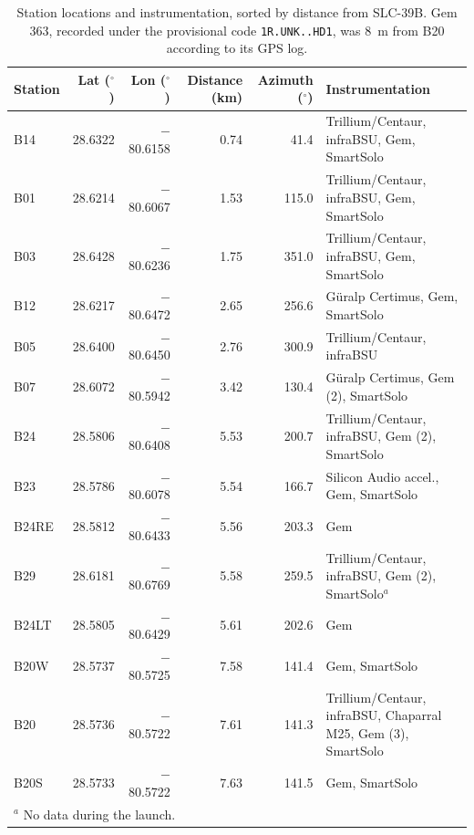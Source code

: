 \begin{table}[htbp]
  \centering
  \caption{Station locations and instrumentation, sorted by distance from SLC-39B. Gem 363, recorded under the provisional code \texttt{1R.UNK..HD1}, was 8~m from B20 according to its GPS log.}
  \label{tab:stations}
  \small
  \begin{tabular}{lrrrrp{5.2cm}}
  \toprule
  Station & Lat ($^{\circ}$) & Lon ($^{\circ}$) & Distance (km) & Azimuth ($^{\circ}$) & Instrumentation \\
  \midrule
  B14 & 28.6322 & $-$80.6158 & 0.74 & 41.4 & Trillium/Centaur, infraBSU, Gem, SmartSolo \\
  B01 & 28.6214 & $-$80.6067 & 1.53 & 115.0 & Trillium/Centaur, infraBSU, Gem, SmartSolo \\
  B03 & 28.6428 & $-$80.6236 & 1.75 & 351.0 & Trillium/Centaur, infraBSU, Gem, SmartSolo \\
  B12 & 28.6217 & $-$80.6472 & 2.65 & 256.6 & G\"{u}ralp Certimus, Gem, SmartSolo \\
  B05 & 28.6400 & $-$80.6450 & 2.76 & 300.9 & Trillium/Centaur, infraBSU \\
  B07 & 28.6072 & $-$80.5942 & 3.42 & 130.4 & G\"{u}ralp Certimus, Gem (2), SmartSolo \\
  B24 & 28.5806 & $-$80.6408 & 5.53 & 200.7 & Trillium/Centaur, infraBSU, Gem (2), SmartSolo \\
  B23 & 28.5786 & $-$80.6078 & 5.54 & 166.7 & Silicon Audio accel., Gem, SmartSolo \\
  B24RE & 28.5812 & $-$80.6433 & 5.56 & 203.3 & Gem \\
  B29 & 28.6181 & $-$80.6769 & 5.58 & 259.5 & Trillium/Centaur, infraBSU, Gem (2), SmartSolo$^{a}$ \\
  B24LT & 28.5805 & $-$80.6429 & 5.61 & 202.6 & Gem \\
  B20W & 28.5737 & $-$80.5725 & 7.58 & 141.4 & Gem, SmartSolo \\
  B20 & 28.5736 & $-$80.5722 & 7.61 & 141.3 & Trillium/Centaur, infraBSU, Chaparral M25, Gem (3), SmartSolo \\
  B20S & 28.5733 & $-$80.5722 & 7.63 & 141.5 & Gem, SmartSolo \\
  \bottomrule
  \multicolumn{6}{l}{$^{a}$ No data during the launch.}
  \end{tabular}
\end{table}
